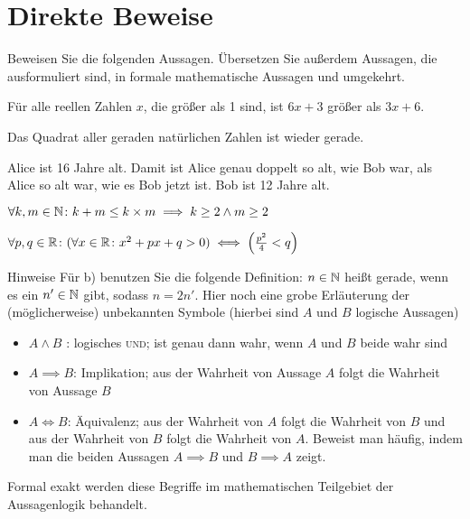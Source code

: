 \documentclass{scrartcl}
\begin{document}
\maketitle

\section{Direkte Beweise }
Beweisen Sie die folgenden Aussagen.
Übersetzen Sie außerdem Aussagen, die ausformuliert sind, in formale mathematische Aussagen und umgekehrt.
\begin{subex}
  \item{} Für alle reellen Zahlen $x$, die größer als 1 sind, ist $6x + 3$ größer als $3x + 6$.
  \item{} Das Quadrat aller geraden natürlichen Zahlen ist wieder gerade.
  \item{} Alice ist 16 Jahre alt. Damit ist Alice genau doppelt so alt, wie Bob war, als Alice so alt war, wie es Bob jetzt ist. Bob ist 12 Jahre alt.
  \item{} $\forall k, m \in \mathbb{N}\colon k + m \le k \times m \implies k \ge 2 \land m \ge 2$
  \item{} $\forall p, q \in \mathbb{R}\colon (\forall x \in \mathbb{R}\colon x^2 + px + q > 0) \iff \left( \frac{p^2}{4} < q \right)$
\end{subex}

\begin{remark}{Hinweise}
  Für b) benutzen Sie die folgende Definition: $n \in \mathbb{N}$ heißt gerade, wenn es ein $n' \in \mathbb{N}$ gibt, sodass $n = 2n'$. Hier noch eine grobe Erläuterung der (möglicherweise) unbekannten Symbole (hierbei sind $A$ und $B$ logische Aussagen)
  \begin{itemize}
    \item $A \land B$ : logisches \textsc{und}; ist genau dann wahr, wenn $A$ und $B$ beide wahr sind
    \item $A \implies B$: Implikation; aus der Wahrheit von Aussage $A$ folgt die Wahrheit von Aussage $B$
    \item $A \iff B$: Äquivalenz; aus der Wahrheit von $A$ folgt die Wahrheit von $B$ und aus der Wahrheit von $B$ folgt die Wahrheit von $A$.
    Beweist man häufig, indem man die beiden Aussagen $A \implies B$ und $B \implies A$ zeigt.
  \end{itemize}
  Formal exakt werden diese Begriffe im mathematischen Teilgebiet der Aussagenlogik behandelt.
\end{remark}
\end{document}
